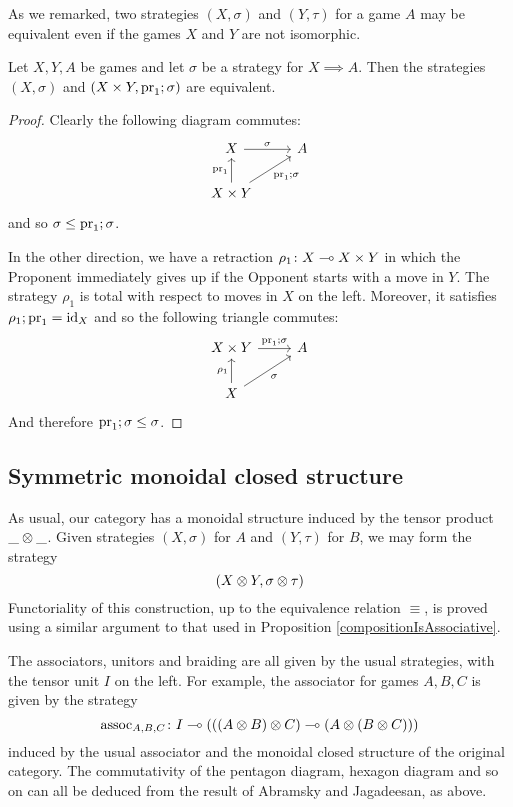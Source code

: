 \documentclass{article}
\begin{document}
As we remarked, two strategies $(X,\sigma)$ and $(Y,\tau)$ for a game $A$ may be equivalent even if the games $X$ and $Y$ are not isomorphic.

\begin{proposition}
  Let $X,Y,A$ be games and let $\sigma$ be a strategy for $X\implies A$.  
  Then the strategies $(X,\sigma)$ and $(X\times Y, \operatorname{pr}_1;\sigma)$ are equivalent.
\end{proposition}
\begin{proof}
  Clearly the following diagram commutes:
  \[
    \begin{tikzcd}
      X \arrow[r, "\sigma"]
        & A \\
      X \times Y \arrow[u, "\pr_1"] \arrow[ur, "\pr_1;\sigma"']
        &
    \end{tikzcd}
    \]
  and so $\sigma\le\operatorname{pr}_1;\sigma$.  

  In the other direction, we have a retraction $\rho_1\colon X\multimap X\times Y$ in which the Proponent immediately gives up if the Opponent starts with a move in $Y$.  
  The strategy $\rho_1$ is total with respect to moves in $X$ on the left.  
  Moreover, it satisfies $\rho_1;\operatorname{pr}_1=\operatorname{id}_X$ and so the following triangle commutes:
  \[
    \begin{tikzcd}
      X\times Y \arrow[r, "\pr_1;\sigma"]
        & A \\
      X \arrow[u, "\rho_1"] \arrow[ur, "\sigma"']
        &
    \end{tikzcd}
    \]
  And therefore $\operatorname{pr}_1;\sigma\le\sigma$.
\end{proof}

\subsection{Symmetric monoidal closed structure}

As usual, our category has a monoidal structure induced by the tensor product $\_\otimes\_$.  
Given strategies $(X,\sigma)$ for $A$ and $(Y,\tau)$ for $B$, we may form the strategy
\[
  (X\otimes Y, \sigma\otimes\tau)
  \]
Functoriality of this construction, up to the equivalence relation $\equiv$, is proved using a similar argument to that used in Proposition \ref{compositionIsAssociative}.  

The associators, unitors and braiding are all given by the usual strategies, with the tensor unit $I$ on the left.  
For example, the associator for games $A,B,C$ is given by the strategy
\[
  \operatorname{assoc}_{A,B,C}\colon I \multimap (((A\otimes B)\otimes C) \multimap (A \otimes(B\otimes C)))
  \]
induced by the usual associator and the monoidal closed structure of the original category.  
The commutativity of the pentagon diagram, hexagon diagram and so on can all be deduced from the result \cite[Theorem 1]{abramskyjagadeesangames} of Abramsky and Jagadeesan, as above.
\end{document}
